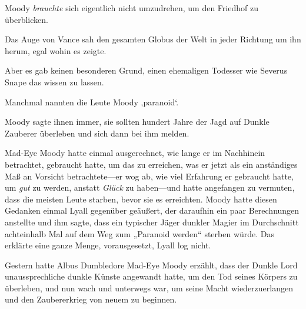 Moody \emph{brauchte} sich eigentlich nicht umzudrehen, um den Friedhof zu überblicken.

Das Auge von Vance sah den gesamten Globus der Welt in jeder Richtung um ihn herum, egal wohin es zeigte.

Aber es gab keinen besonderen Grund, einen ehemaligen Todesser wie Severus Snape das wissen zu lassen.

Manchmal nannten die Leute Moody ‚paranoid‘.

Moody sagte ihnen immer, sie sollten hundert Jahre der Jagd auf Dunkle Zauberer überleben und sich dann bei ihm melden.

Mad-Eye Moody hatte einmal ausgerechnet, wie lange er im Nachhinein betrachtet, gebraucht hatte, um das zu erreichen, was er jetzt als ein anständiges Maß an Vorsicht betrachtete—er wog ab, wie viel Erfahrung er gebraucht hatte, um \emph{gut} zu werden, anstatt \emph{Glück} zu haben—und hatte angefangen zu vermuten, dass die meisten Leute starben, bevor sie es erreichten. Moody hatte diesen Gedanken einmal Lyall gegenüber geäußert, der daraufhin ein paar Berechnungen anstellte und ihm sagte, dass ein typischer Jäger dunkler Magier im Durchschnitt achteinhalb Mal auf dem Weg zum „Paranoid werden“ sterben würde. Das erklärte eine ganze Menge, vorausgesetzt, Lyall log nicht.

Gestern hatte Albus Dumbledore Mad-Eye Moody erzählt, dass der Dunkle Lord unaussprechliche dunkle Künste angewandt hatte, um den Tod seines Körpers zu überleben, und nun wach und unterwegs war, um seine Macht wiederzuerlangen und den Zaubererkrieg von neuem zu beginnen.

